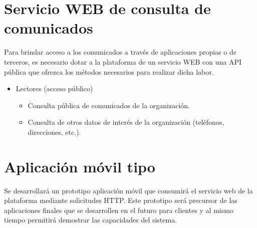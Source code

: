 \section{Servicio WEB de consulta de comunicados}
Para brindar acceso a los comunicados a través de aplicaciones propias o de terceros, es necesario dotar a la plataforma de un servicio WEB con una API pública que ofrezca los métodos necesarios para realizar dicha labor.
\begin{itemize}
    \item Lectores (acceso público)
    \begin{itemize}
        \item Consulta pública de comunicados de la organización.
        \item Consulta de otros datos de interés de la organización (teléfonos, direcciones, etc.).
    \end{itemize} 
\end{itemize}

\section{Aplicación móvil tipo}
Se desarrollará un prototipo aplicación móvil que consumirá el servicio web de la plataforma mediante solicitudes HTTP. Este prototipo será precursor de las aplicaciones finales que se desarrollen en el futuro para clientes y al mismo tiempo permitirá demostrar las capacidades del sistema.